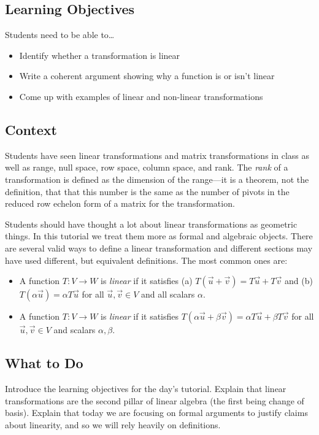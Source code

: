 \documentclass[red]{tutorial}
\theoremstyle{definition}
\theoremstyle{theorem}
\begin{document}
	\begin{instructions}
\subsection*{Learning Objectives}
	Students need to be able to\ldots
	\begin{itemize}
		\item Identify whether a transformation is linear
		\item Write a coherent argument showing why a function is or isn't linear
		\item Come up with examples of linear and non-linear transformations
	\end{itemize}

\vspace*{-.5cm}
\subsection*{Context}
	Students have seen linear transformations and matrix transformations in class as well
		as range, null space, row space, column space, and rank. The \emph{rank} of a transformation
		is defined as the dimension of the range---it is a theorem, not the definition,
		that that this number is the same as the number of pivots in the reduced row
		echelon form of a matrix for the transformation.
	
	Students should have thought a lot about linear transformations as geometric things.
		In this tutorial we treat them more as formal and algebraic objects. There are
		several valid ways to define a linear transformation and different sections
		may have used different, but equivalent definitions. The most common ones are:

	\begin{itemize}
		\item A function $T:V\to W$ is \emph{linear} if it satisfies (a) $T(\vec u+\vec v)=T\vec u+T\vec v$
			and (b) $T(\alpha\vec u)=\alpha T\vec u$ for all $\vec u,\vec v\in V$ and all scalars $\alpha$.
		\item A function $T:V\to W$ is \emph{linear} if it satisfies $T(\alpha\vec u+\beta\vec v)=\alpha T\vec u+
			\beta T\vec v$ for all $\vec u,\vec v\in V$ and scalars $\alpha,\beta$.
	\end{itemize}

\vspace*{-.5cm}
\subsection*{What to Do}
	Introduce the learning objectives for the day's tutorial. Explain that linear transformations
		are the second pillar of linear algebra (the first being change of basis).
		Explain that today we are focusing on formal arguments to justify claims
		about linearity, and so we will rely heavily on definitions.


\end{instructions}
\end{document}
